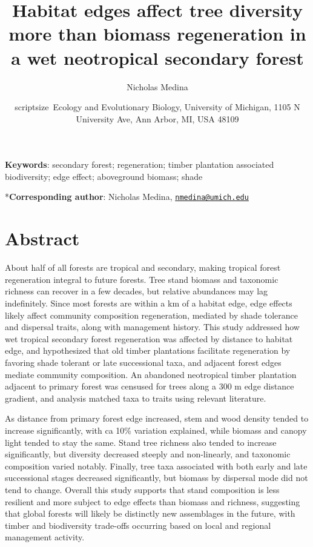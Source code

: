 \documentclass[
  12pt,
]{article}
\title{Habitat edges affect tree diversity more than biomass regeneration in a wet neotropical secondary forest}
\author{Nicholas Medina}
\date{scriptsize~Ecology and Evolutionary Biology, University of Michigan, 1105 N University Ave, Ann Arbor, MI, USA 48109}
\begin{document}
\maketitle

\hfill\break
\hfill\break

\textbf{Keywords}: secondary forest; regeneration; timber plantation associated biodiversity; edge effect; aboveground biomass; shade

\hfill\break
\hfill\break

*\textbf{Corresponding author}: Nicholas Medina, \href{mailto:nmedina@umich.edu}{\nolinkurl{nmedina@umich.edu}}

\newpage

\hypertarget{abstract}{%
\section*{Abstract}\label{abstract}}

About half of all forests are tropical and secondary, making tropical forest regeneration integral to future forests.
Tree stand biomass and taxonomic richness can recover in a few decades, but relative abundances may lag indefinitely.
Since most forests are within a km of a habitat edge, edge effects likely affect community composition regeneration, mediated by shade tolerance and dispersal traits, along with management history.
This study addressed how wet tropical secondary forest regeneration was affected by distance to habitat edge, and hypothesized that old timber plantations facilitate regeneration by favoring shade tolerant or late successional taxa, and adjacent forest edges mediate community composition.
An abandoned neotropical timber plantation adjacent to primary forest was censused for trees along a 300 m edge distance gradient, and analysis matched taxa to traits using relevant literature.

As distance from primary forest edge increased, stem and wood density tended to increase significantly, with ca 10\% variation explained, while biomass and canopy light tended to stay the same.
Stand tree richness also tended to increase significantly, but diversity decreased steeply and non-linearly, and taxonomic composition varied notably.
Finally, tree taxa associated with both early and late successional stages decreased significantly, but biomass by dispersal mode did not tend to change.
Overall this study supports that stand composition is less resilient and more subject to edge effects than biomass and richness, suggesting that global forests will likely be distinctly new assemblages in the future, with timber and biodiversity trade-offs occurring based on local and regional management activity.
\end{document}
